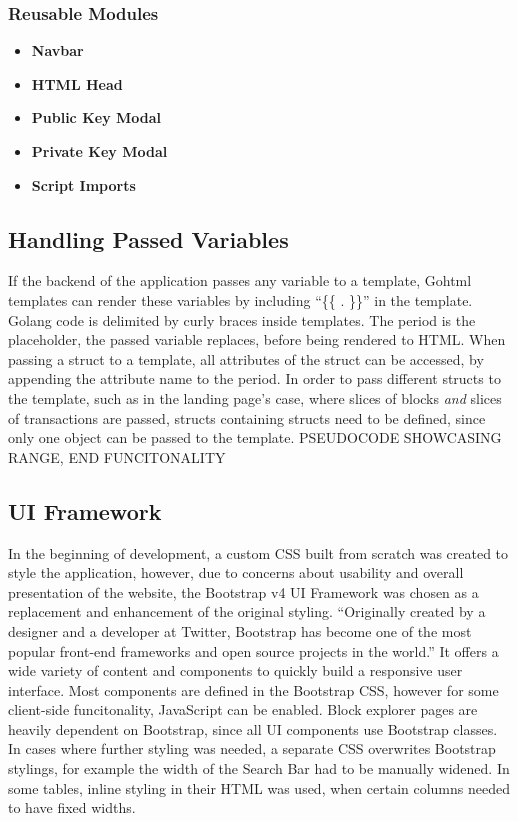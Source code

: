 \subsubsection{Reusable Modules}
\begin{itemize}
\item \textbf{Navbar}
\item \textbf{HTML Head}
\item \textbf{Public Key Modal}
\item \textbf{Private Key Modal}
\item \textbf{Script Imports}
\end{itemize}

\subsection{Handling Passed Variables}
If the backend of the application passes any variable to a template, Gohtml templates can render these variables by including ``\{\{ . \}\}'' in the template. Golang code is delimited by curly braces inside templates. The period is the placeholder, the passed variable replaces, before being rendered to HTML. When passing a struct to a template, all attributes of the struct can be accessed, by appending the attribute name to the period. In order to pass different structs to the template, such as in the landing page's case, where slices of blocks \emph{and} slices of transactions are passed, structs containing structs need to be defined, since only one object can be passed to the template.
PSEUDOCODE SHOWCASING RANGE, END FUNCITONALITY

\subsection{UI Framework} \label{sec:uiframeworks}
In the beginning of development, a custom CSS built from scratch was created to style the application, however, due to concerns about usability and overall presentation of the website, the Bootstrap v4 UI Framework \cite{bootstrap} was chosen as a replacement and enhancement of the original styling.
``Originally created by a designer and a developer at Twitter, Bootstrap has become one of the most popular front-end frameworks and open source projects in the world.'' \cite{bootstraphistory}
It offers a wide variety of content and components to quickly build a responsive user interface. Most components are defined in the Bootstrap CSS, however for some client-side funcitonality, JavaScript can be enabled. Block explorer pages are heavily dependent on Bootstrap, since all UI components use Bootstrap classes. In cases where further styling was needed, a separate CSS overwrites Bootstrap stylings, for example the width of the Search Bar had to be manually widened. In some tables, inline styling in their HTML was used, when certain columns needed to have fixed widths.

